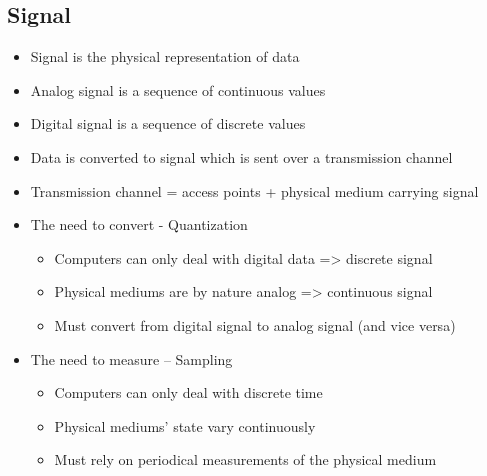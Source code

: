 \documentclass[numbers=endperiod]{scrartcl}
\begin{document}
\subsection{Signal}
\begin{itemize}
	\item Signal is the physical representation of data
	\item Analog signal is a sequence of continuous values
	\item Digital signal is a sequence of discrete values
	\item Data is converted to signal which is sent over a transmission channel
	\item Transmission channel = access points + physical medium carrying signal
	\item The need to convert - Quantization
	\begin{itemize}
		\item Computers can only deal with digital data => discrete signal
		\item Physical mediums are by nature analog => continuous signal
		\item Must convert from digital signal to analog signal (and vice versa)
	\end{itemize}
	\item The need to measure -- Sampling
	\begin{itemize}
		\item Computers can only deal with discrete time
		\item Physical mediums’ state vary continuously
		\item Must rely on periodical measurements of the physical medium
	\end{itemize}
\end{itemize}

\end{document}
